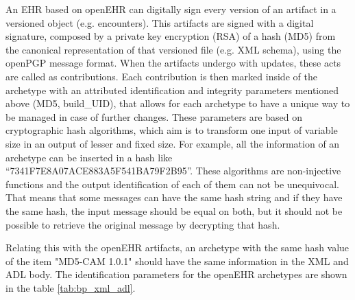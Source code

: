 \documentclass[mim_thesis.tex]{subfiles}
\begin{document}
An EHR based on openEHR can digitally sign every version of an artifact in a versioned object (e.g. encounters). This artifacts are signed with a digital signature, composed by a private key encryption (RSA) of a hash (MD5) from the canonical representation of that versioned file (e.g. XML schema), using the openPGP message format. When the artifacts undergo with updates, these acts are called as contributions. Each contribution is then marked inside of the archetype with an attributed identification and integrity parameters mentioned above (MD5, build\_UID), that allows for each archetype to have a unique way to be managed in case of further changes. These parameters are based on cryptographic hash algorithms, which aim is to transform one input of variable size in an output of lesser and fixed size. For example, all the information of an archetype can be inserted in a hash like “7341F7E8A07ACE883A5F541BA79F2B95”. These algorithms are non-injective functions and the output identification of each of them can not be unequivocal. That means that some messages can have the same hash string and if they have the same hash, the input message should be equal on both, but it should not be possible to retrieve the original message by decrypting that hash. 

Relating this with the openEHR artifacts, an archetype with the same hash value of the item "MD5-CAM 1.0.1" should have the same information in the XML and ADL body. The identification parameters for the openEHR archetypes are shown in the table \ref{tab:bp_xml_adl}.
\end{document}
